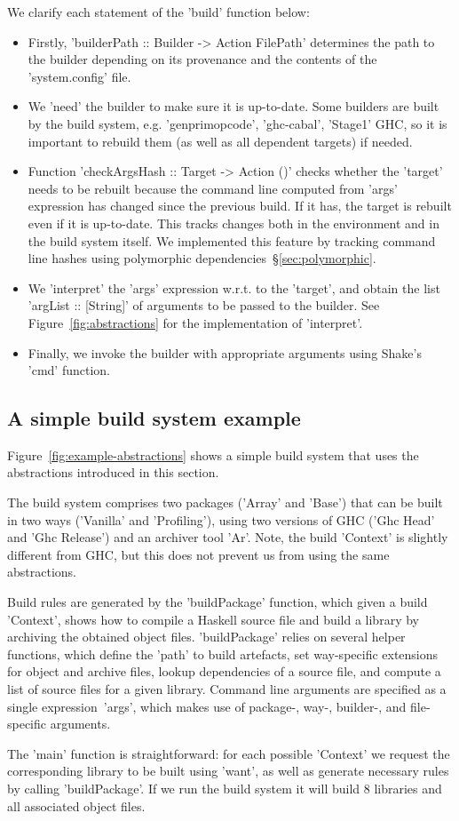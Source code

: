 \noindent We clarify each statement of the \lst'build' function below:
\begin{itemize}
  \item Firstly, \lst'builderPath :: Builder -> Action FilePath' determines the
  path to the builder depending on its provenance and the contents of the
  \lst'system.config' file.
  \item We \lst'need' the builder to make sure it is up-to-date. Some builders
  are built by the build system, e.g. \lst'genprimopcode',
  \lst'ghc-cabal', \lst'Stage1' GHC, so it is important to rebuild them (as well
  as all dependent targets) if needed.
  \item Function \lst'checkArgsHash :: Target -> Action ()' checks whether the
  \lst'target' needs to be rebuilt because the command line computed from
  \lst'args' expression has changed since the previous build. If it has,
  the target is rebuilt even if it is up-to-date. This tracks changes both in
  the environment and in the build system itself. We implemented this feature
  by tracking command line hashes using polymorphic dependencies~\S\ref{sec:polymorphic}.
  \item We \lst'interpret' the \lst'args' expression w.r.t. to the
  \lst'target', and obtain the list \lst'argList :: [String]' of arguments to be
  passed to the builder. See Figure~\ref{fig:abstractions} for the implementation of
  \lst'interpret'.
  \item Finally, we invoke the builder with appropriate arguments using Shake's
  \lst'cmd' function.
\end{itemize}

\subsection{A simple build system example\label{sec:build-example}}

Figure~\ref{fig:example-abstractions} shows a simple build system that uses the
abstractions introduced in this section.

The build system comprises two packages (\lst'Array' and \lst'Base') that can
be built in two ways (\lst'Vanilla' and \lst'Profiling'), using two versions
of GHC (\lst'Ghc Head' and \lst'Ghc Release') and an archiver tool \lst'Ar'.
Note, the build \lst'Context' is slightly different from GHC, but this does not
prevent us from using the same abstractions.

Build rules are generated by the \lst'buildPackage' function, which given a
build \lst'Context', shows how to compile a Haskell source file and build a
library by archiving the obtained object files. \lst'buildPackage' relies on
several helper functions, which define the \lst'path' to build artefacts,
set way-specific extensions for object and archive files, lookup
dependencies of a source file, and compute a list of source files for a given
library. Command line arguments are specified as a single expression~\lst'args',
which makes use of package-, way-, builder-, and file-specific arguments.

The \lst'main' function is straightforward: for each possible \lst'Context'
we request the corresponding library to be built using \lst'want', as well as
generate necessary rules by calling \lst'buildPackage'. If we run the build
system it will build 8 libraries and all associated object files.

